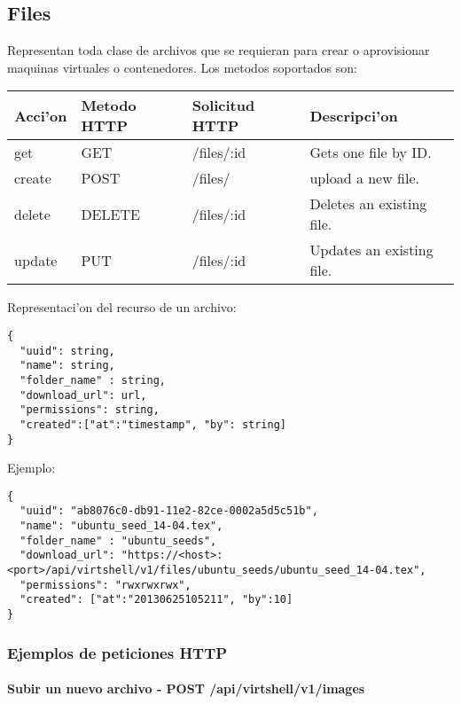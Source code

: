\subsection{Files}
Representan toda clase de archivos que se requieran para crear o aprovisionar maquinas virtuales o contenedores. Los metodos soportados son:

\begin{center}
 \begin{tabular}{| l | l | l | l |}
 \hline
  \rowcolor{blueapi}
  \textbf{Acci'on} & \textbf{Metodo HTTP} & \textbf{Solicitud HTTP} & \textbf{Descripci'on} \\ [0.5ex] 
  \hline\hline
  get & GET & /files/:id & Gets one file by ID. \\
  \hline
  create & POST & /files/ & upload a new file. \\
  \hline
  delete & DELETE & /files/:id & Deletes an existing file. \\
  \hline  
  update & PUT & /files/:id & Updates an existing file. \\ [1ex]  
  \hline
\end{tabular}
\end{center}

\vspace{1cm}
Representaci'on del recurso de un archivo:
\vspace{1cm}

\begin{lstlisting}[style=json]
{
  "uuid": string,
  "name": string,
  "folder_name" : string,
  "download_url": url,
  "permissions": string,
  "created":["at":"timestamp", "by": string]
}
\end{lstlisting}

Ejemplo:

\medskip
\begin{lstlisting}[style=json]
{
  "uuid": "ab8076c0-db91-11e2-82ce-0002a5d5c51b",
  "name": "ubuntu_seed_14-04.tex",
  "folder_name" : "ubuntu_seeds",
  "download_url": "https://<host>:<port>/api/virtshell/v1/files/ubuntu_seeds/ubuntu_seed_14-04.tex",
  "permissions": "rwxrwxrwx",
  "created": ["at":"20130625105211", "by":10]
}
\end{lstlisting}

\subsubsection{Ejemplos de peticiones HTTP}

\paragraph{Subir un nuevo archivo - POST /api/virtshell/v1/images} ~\\

